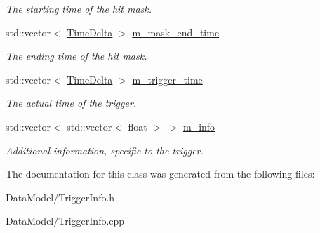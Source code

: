 \begin{DoxyCompactItemize}
\begin{DoxyCompactList}\small\item\em The starting time of the hit mask. \end{DoxyCompactList}\item 
\hypertarget{classTriggerInfo_aea9dee3503ce18d1f7419c30e502b502}{std\-::vector$<$ \hyperlink{classTimeDelta}{Time\-Delta} $>$ \hyperlink{classTriggerInfo_aea9dee3503ce18d1f7419c30e502b502}{m\-\_\-mask\-\_\-end\-\_\-time}}\label{classTriggerInfo_aea9dee3503ce18d1f7419c30e502b502}

\begin{DoxyCompactList}\small\item\em The ending time of the hit mask. \end{DoxyCompactList}\item 
\hypertarget{classTriggerInfo_a296c17ef4291b793f2d4bb0acaa8d541}{std\-::vector$<$ \hyperlink{classTimeDelta}{Time\-Delta} $>$ \hyperlink{classTriggerInfo_a296c17ef4291b793f2d4bb0acaa8d541}{m\-\_\-trigger\-\_\-time}}\label{classTriggerInfo_a296c17ef4291b793f2d4bb0acaa8d541}

\begin{DoxyCompactList}\small\item\em The actual time of the trigger. \end{DoxyCompactList}\item 
\hypertarget{classTriggerInfo_ade80e80d18eae83c0c484e79dbf1207d}{std\-::vector$<$ std\-::vector$<$ float $>$ $>$ \hyperlink{classTriggerInfo_ade80e80d18eae83c0c484e79dbf1207d}{m\-\_\-info}}\label{classTriggerInfo_ade80e80d18eae83c0c484e79dbf1207d}

\begin{DoxyCompactList}\small\item\em Additional information, specific to the trigger. \end{DoxyCompactList}\end{DoxyCompactItemize}


The documentation for this class was generated from the following files\-:\begin{DoxyCompactItemize}
\item 
Data\-Model/Trigger\-Info.\-h\item 
Data\-Model/Trigger\-Info.\-cpp\end{DoxyCompactItemize}
